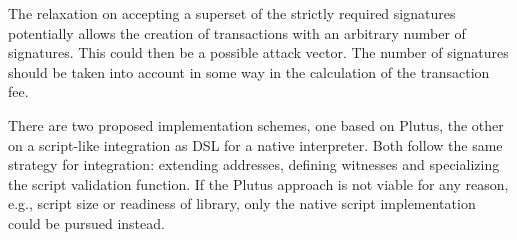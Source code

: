 \documentclass[11pt,a4paper,dvipsnames,twosided]{article}
\theoremstyle{definition}
\begin{document}
The relaxation on accepting a superset of the strictly required signatures
potentially allows the creation of transactions with an arbitrary number of signatures. This
could then be a possible attack vector. The number of signatures should be taken
into account in some way in the calculation of the transaction fee.

There are two proposed implementation schemes, one based on Plutus, the other on
a script-like integration as DSL for a native interpreter. Both follow the same
strategy for integration: extending addresses, defining witnesses and
specializing the script validation function. If the Plutus approach is not
viable for any reason, e.g., script size or readiness of library, only the
native script implementation could be pursued instead.



\end{document}
